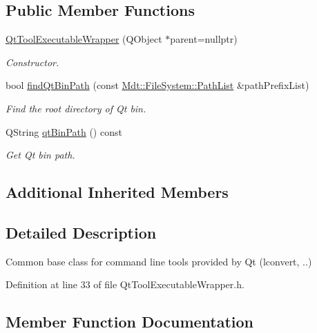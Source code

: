\subsection*{Public Member Functions}
\begin{DoxyCompactItemize}
\item 
\hyperlink{class_mdt_1_1_deploy_utils_1_1_qt_tool_executable_wrapper_a498a2a4deb8f1e59c020f523b9f65f6a}{Qt\+Tool\+Executable\+Wrapper} (Q\+Object $\ast$parent=nullptr)\hypertarget{class_mdt_1_1_deploy_utils_1_1_qt_tool_executable_wrapper_a498a2a4deb8f1e59c020f523b9f65f6a}{}\label{class_mdt_1_1_deploy_utils_1_1_qt_tool_executable_wrapper_a498a2a4deb8f1e59c020f523b9f65f6a}

\begin{DoxyCompactList}\small\item\em Constructor. \end{DoxyCompactList}\item 
bool \hyperlink{class_mdt_1_1_deploy_utils_1_1_qt_tool_executable_wrapper_affa733c47d5633c5eca8b365f464eb18}{find\+Qt\+Bin\+Path} (const \hyperlink{class_mdt_1_1_file_system_1_1_path_list}{Mdt\+::\+File\+System\+::\+Path\+List} \&path\+Prefix\+List)
\begin{DoxyCompactList}\small\item\em Find the root directory of Qt bin. \end{DoxyCompactList}\item 
Q\+String \hyperlink{class_mdt_1_1_deploy_utils_1_1_qt_tool_executable_wrapper_adbe9fe3f7f68552479aada57772967af}{qt\+Bin\+Path} () const 
\begin{DoxyCompactList}\small\item\em Get Qt bin path. \end{DoxyCompactList}\end{DoxyCompactItemize}
\subsection*{Additional Inherited Members}


\subsection{Detailed Description}
Common base class for command line tools provided by Qt (lconvert, ..) 

Definition at line 33 of file Qt\+Tool\+Executable\+Wrapper.\+h.



\subsection{Member Function Documentation}
